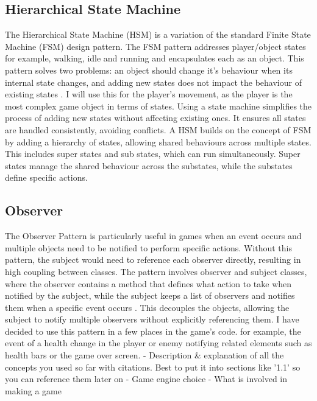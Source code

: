 \documentclass[]{final_report}
\begin{document}
\subsection{Hierarchical State Machine}\label{HSM}
The Hierarchical State Machine (HSM)  is a variation of the standard Finite State Machine (FSM) design pattern. The FSM pattern addresses player/object states for example, walking, idle and running and encapsulates each as an object. This pattern solves two problems: an object should change it’s behaviour when its internal state changes, and adding new states does not impact the behaviour of existing states \cite{unity2022_patterns}. I will use this for the player's movement, as the player is the most complex game object in terms of states. Using a state machine simplifies the process of adding new states without affecting existing ones.  It ensures all states are handled consistently, avoiding conflicts. A HSM builds on the concept of FSM by adding a hierarchy of states, allowing shared behaviours across multiple states. This includes super states and sub states, which can run simultaneously. Super states manage the shared behaviour across the substates, while the substates define specific actions.
\subsection{Observer}\label{observer}
The Observer Pattern is particularly useful in games when an event occurs and multiple objects need to be notified to perform specific actions. Without this pattern, the subject would need to reference each observer directly, resulting in high coupling between classes. The pattern involves observer and subject classes, where the observer contains a method that defines what action to take when notified by the subject, while the subject keeps a list of observers and notifies them when a specific event occurs \cite{nystrom2011game}. This decouples the objects, allowing the subject to notify multiple observers without explicitly referencing them. I have decided to use this pattern in a few places in the game's code. for example, the event of a health change in the player or enemy notifying related elements such as health bars or the game over screen.
\newline
- Description \& explanation of all the concepts you used so far with citations. Best to put it into sections like '1.1' so you can reference them later on \newline
- Game engine choice  \newline
- What is involved in making a game  \newline
 
\end{document}
